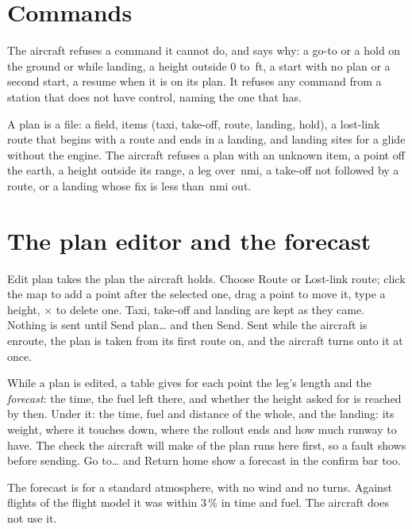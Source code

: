 \documentclass[11pt,a4paper,oneside]{book}
\newcommand{\Tab}[1]{}
\newcommand{\ann}[1]{\textsf{#1}}
\begin{document}
\section{Commands}\label{sec:commands}
\begin{center}\small\Tab{ctl_commands}\end{center}
\begin{center}\small\Tab{ctl_confirmingacommand}\end{center}
The aircraft refuses a command it cannot do, and says why: a go-to or a hold on the ground or while landing, a height
outside 0 to \MMaxAlt\,ft, a start with no plan or a second start, a resume when it is on its plan. It refuses any
command from a station that does not have control, naming the one that has.

A plan is a file: a field, items (taxi, take-off, route, landing, hold), a lost-link route that begins with a route
and ends in a landing, and landing sites for a glide without the engine. The aircraft refuses a plan with an unknown
item, a point off the earth, a height outside its range, a leg over \MMaxLeg\,nmi, a take-off not followed by a
route, or a landing whose fix is less than \MMinFinal\,nmi out.

\section{The plan editor and the forecast}\label{sec:editor}
\ann{Edit plan} takes the plan the aircraft holds. Choose \ann{Route} or \ann{Lost-link route}; click the map to add a
point after the selected one, drag a point to move it, type a height, $\times$ to delete one. Taxi, take-off and
landing are kept as they came. Nothing is sent until \ann{Send plan\ldots} and then \ann{Send}. Sent while the
aircraft is enroute, the plan is taken from its first route on, and the aircraft turns onto it at once.
\begin{center}\small\Tab{ctl_planeditor}\end{center}
While a plan is edited, a table gives for each point the leg's length and the \emph{forecast}: the time, the fuel left
there, and whether the height asked for is reached by then. Under it: the time, fuel and distance of the whole, and
the landing: its weight, where it touches down, where the rollout ends and how much runway to have. The check the
aircraft will make of the plan runs here first, so a fault shows before sending. \ann{Go to\ldots} and \ann{Return
home} show a forecast in the confirm bar too.
\begin{note}
The forecast is for a standard atmosphere, with no wind and no turns. Against flights of the flight model it was
within 3\,\% in time and fuel. The aircraft does not use it.
\end{note}
\end{document}
